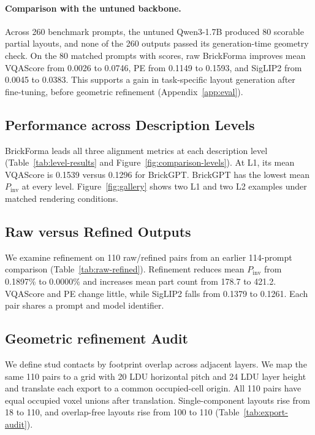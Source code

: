 \documentclass[letterpaper]{article} %
\begin{document}
\paragraph{Comparison with the untuned backbone.} Across 260 benchmark prompts, the untuned Qwen3-1.7B produced 80 scorable partial layouts, and none of the 260 outputs passed its generation-time geometry check. On the 80 matched prompts with scores, raw BrickForma improves mean VQAScore from 0.0026 to 0.0746, PE from 0.1149 to 0.1593, and SigLIP2 from 0.0045 to 0.0383. This supports a gain in task-specific layout generation after fine-tuning, before geometric refinement (Appendix~\ref{app:eval}).

\subsection{Performance across Description Levels}

BrickForma leads all three alignment metrics at each description level (Table~\ref{tab:level-results} and Figure~\ref{fig:comparison-levels}). At L1, its mean VQAScore is 0.1539 versus 0.1296 for BrickGPT. BrickGPT has the lowest mean $P_{\mathrm{inv}}$ at every level. Figure~\ref{fig:gallery} shows two L1 and two L2 examples under matched rendering conditions.



\subsection{Raw versus Refined Outputs}

We examine refinement on 110 raw/refined pairs from an earlier 114-prompt comparison (Table~\ref{tab:raw-refined}). Refinement reduces mean $P_{\mathrm{inv}}$ from 0.1897\% to 0.0000\% and increases mean part count from 178.7 to 421.2. VQAScore and PE change little, while SigLIP2 falls from 0.1379 to 0.1261. Each pair shares a prompt and model identifier.

\subsection{Geometric refinement Audit}
\label{sec:diagnostics}
We define stud contacts by footprint overlap across adjacent layers. We map the same 110 pairs to a grid with 20 LDU horizontal pitch and 24 LDU layer height and translate each export to a common occupied-cell origin. All 110 pairs have equal occupied voxel unions after translation. Single-component layouts rise from 18 to 110, and overlap-free layouts rise from 100 to 110 (Table~\ref{tab:export-audit}).

\end{document}

